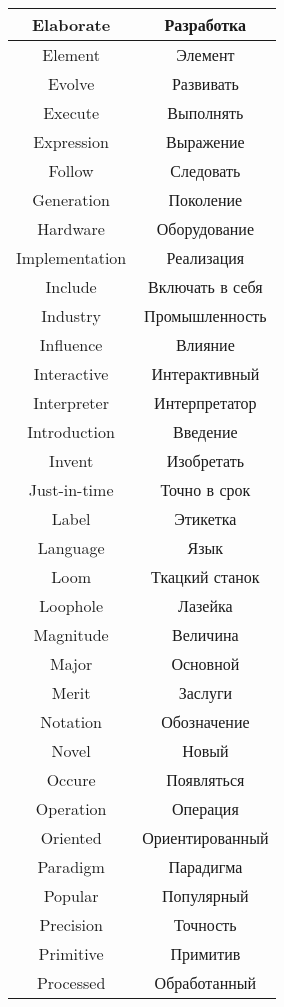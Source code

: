 \begin{table}[h!]
  \centering
  \begin{tabular}{|*{2}{C{.4}|}} \hline
    Elaborate & Разработка \\ \hline
    Element & Элемент \\ \hline
    Evolve & Развивать \\ \hline
    Execute & Выполнять \\ \hline
    Expression & Выражение \\ \hline
    Follow & Следовать \\ \hline
    Generation & Поколение \\ \hline
    Hardware & Оборудование \\ \hline
    Implementation & Реализация \\ \hline
    Include & Включать в себя \\ \hline
    Industry & Промышленность \\ \hline
    Influence & Влияние \\ \hline
    Interactive & Интерактивный \\ \hline
    Interpreter & Интерпретатор \\ \hline
    Introduction & Введение \\ \hline
    Invent & Изобретать \\ \hline
    Just-in-time & Точно в срок \\ \hline
    Label & Этикетка \\ \hline
    Language & Язык \\ \hline
    Loom & Ткацкий станок \\ \hline
    Loophole & Лазейка \\ \hline
    Magnitude & Величина \\ \hline
    Major & Основной \\ \hline
    Merit & Заслуги \\ \hline
    Notation & Обозначение \\ \hline
    Novel & Новый \\ \hline
    Occure & Появляться \\ \hline
    Operation & Операция \\ \hline
    Oriented & Ориентированный \\ \hline
    Paradigm & Парадигма \\ \hline
    Popular & Популярный \\ \hline
    Precision & Точность \\ \hline
    Primitive & Примитив \\ \hline
    Processed & Обработанный \\ \hline
  \end{tabular}
\end{table}

